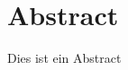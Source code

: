 
\begingroup
\let\clearpage\relax
\let\cleardoublepage\relax
\let\cleardoublepage\relax

\chapter*{Abstract}

Dies ist ein Abstract

\vfill

\endgroup			

\vfill